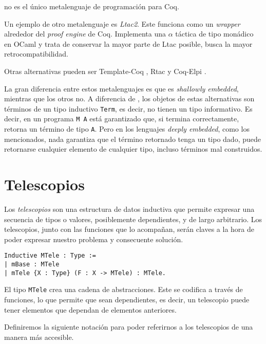 \Mtac no es el único metalenguaje de programación para Coq. 

Un ejemplo de otro metalenguaje es \emph{Ltac2}.
Este funciona como un \emph{wrapper} alrededor del \emph{proof engine} de Coq.
Implementa una $\alpha$ táctica de tipo monádico en OCaml y trata de conservar la mayor parte de Ltac posible, busca la mayor retrocompatibilidad.

Otras alternativas pueden ser Template-Coq \cite{DBLP:conf/itp/AnandBCST18}, Rtac \cite{DBLP:conf/esop/MalechaB16} y Coq-Elpi \cite{tassi:hal-01637063}.

La gran diferencia entre estos metalenguajes es que \Mtac es \emph{shallowly embedded}, mientras que los otros no. A diferencia de \Mtac, los objetos de estas alternativas son términos de un tipo inductivo \lstinline{Term}, es decir, no tienen un tipo informativo. Es decir, en \Mtac un programa \lstinline{M A} está garantizado que, si termina correctamente, retorna un término de tipo \lstinline{A}. Pero en los lenguajes \emph{deeply embedded}, como los mencionados, nada garantiza que el término retornado tenga un tipo dado, puede retornarse cualquier elemento de cualquier tipo, incluso términos mal construidos.

\section{Telescopios}

Los \emph{telescopios} son una estructura de datos inductiva %
que permite expresar una secuencia de tipos o valores, posiblemente dependientes, y de largo arbitrario.
Los telescopios, junto con las funciones que lo acompañan, serán claves a la hora de poder expresar nuestro problema y consecuente solución.

\begin{lstlisting}[float=h,frame=tb,caption={Definición de telescopio},label=lst:MTele]
Inductive MTele : Type :=
| mBase : MTele
| mTele {X : Type} (F : X -> MTele) : MTele.
\end{lstlisting}

El tipo \lstinline{MTele} crea una cadena de abstracciones.
Este se codifica a través de funciones, lo que permite que sean dependientes, es decir, un telescopio puede tener elementos que dependan de elementos anteriores.

Definiremos la siguiente notación para poder referirnos a los telescopios de una manera más accesible.

